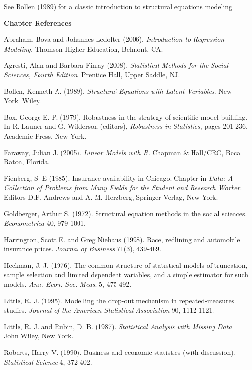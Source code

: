 See Bollen (1989) for a classic introduction to structural equations
modeling.

\bigskip


\textbf{Chapter References}

\begin{multicols}{2}


Abraham, Bova and Johannes Ledolter (2006). \textit{Introduction to
Regression Modeling.} Thomson Higher Education, Belmont, CA.

Agresti, Alan and Barbara Finlay (2008). \textit{Statistical Methods
for the Social Sciences, Fourth Edition}. Prentice Hall, Upper
Saddle, NJ.

Bollen, Kenneth A. (1989). \textit{Structural Equations with Latent
Variables}. New York: Wiley.

Box, George E. P. (1979). Robustness in the strategy of scientific
model building. In R. Launer and G. Wilderson (editors),
\textit{Robustness in Statistics}, pages 201-236, Academic Press,
New York.

Faraway, Julian J. (2005). \textit{Linear Models with R}. Chapman \&
Hall/CRC, Boca Raton, Florida.

Fienberg, S. E (1985). Insurance availability in Chicago. Chapter in
\textit{Data: A Collection of Problems from Many Fields for the
Student and Research Worker}. Editors D.F. Andrews and A. M.
Herzberg, Springer-Verlag, New York.

Goldberger, Arthur S. (1972).  Structural equation methods in the
social sciences.  \textit{Econometrica} 40, 979-1001.

Harrington, Scott E. and Greg Niehaus (1998). Race, redlining and
automobile insurance prices. \textit{Journal of Business} 71(3),
439-469.

Heckman, J. J. (1976). The common structure of statistical models of
truncation, sample selection and limited dependent variables, and a
simple estimator for such models. \textit{Ann. Econ. Soc. Meas}. 5,
475-492.

Little, R. J.  (1995). Modelling the drop-out mechanism in
repeated-measures studies. \textit{Journal of the American
Statistical Association} 90, 1112-1121.

Little, R. J. and Rubin, D. B. (1987).  \textit{Statistical Analysis
with Missing Data.}  John Wiley, New York.

Roberts, Harry V. (1990). Business and economic statistics (with
discussion). \textit{Statistical Science} 4, 372-402.


\end{multicols}
